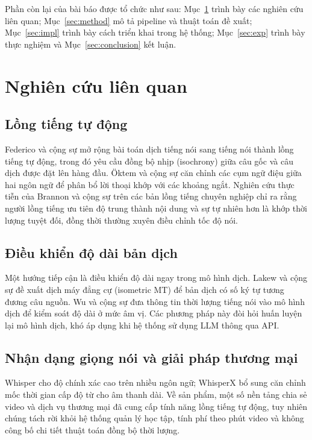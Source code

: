 \documentclass{IEEEtran}
\begin{document}
Phần còn lại của bài báo được tổ chức như sau: Mục~\ref{sec:related} trình bày các nghiên cứu liên quan; Mục~\ref{sec:method} mô tả pipeline và thuật toán đề xuất; Mục~\ref{sec:impl} trình bày cách triển khai trong hệ thống; Mục~\ref{sec:exp} trình bày thực nghiệm và Mục~\ref{sec:conclusion} kết luận.

\section{Nghiên cứu liên quan}
\label{sec:related}

\subsection{Lồng tiếng tự động}
Federico và cộng sự \cite{federico2020} mở rộng bài toán dịch tiếng nói sang tiếng nói thành lồng tiếng tự động, trong đó yêu cầu đồng bộ nhịp (isochrony) giữa câu gốc và câu dịch được đặt lên hàng đầu. \"{O}ktem và cộng sự \cite{oktem2019} căn chỉnh các cụm ngữ điệu giữa hai ngôn ngữ để phân bổ lời thoại khớp với các khoảng ngắt. Nghiên cứu thực tiễn của Brannon và cộng sự \cite{brannon2023} trên các bản lồng tiếng chuyên nghiệp chỉ ra rằng người lồng tiếng ưu tiên độ trung thành nội dung và sự tự nhiên hơn là khớp thời lượng tuyệt đối, đồng thời thường xuyên điều chỉnh tốc độ nói.

\subsection{Điều khiển độ dài bản dịch}
Một hướng tiếp cận là điều khiển độ dài ngay trong mô hình dịch. Lakew và cộng sự \cite{lakew2022} đề xuất dịch máy đẳng cự (isometric MT) để bản dịch có số ký tự tương đương câu nguồn. Wu và cộng sự \cite{wu2023videodubber} đưa thông tin thời lượng tiếng nói vào mô hình dịch để kiểm soát độ dài ở mức âm vị. Các phương pháp này đòi hỏi huấn luyện lại mô hình dịch, khó áp dụng khi hệ thống sử dụng LLM thông qua API.

\subsection{Nhận dạng giọng nói và giải pháp thương mại}
Whisper \cite{radford2023whisper} cho độ chính xác cao trên nhiều ngôn ngữ; WhisperX \cite{bain2023whisperx} bổ sung căn chỉnh mốc thời gian cấp độ từ cho âm thanh dài. Về sản phẩm, một số nền tảng chia sẻ video và dịch vụ thương mại đã cung cấp tính năng lồng tiếng tự động, tuy nhiên chúng tách rời khỏi hệ thống quản lý học tập, tính phí theo phút video và không công bố chi tiết thuật toán đồng bộ thời lượng.
\end{document}
